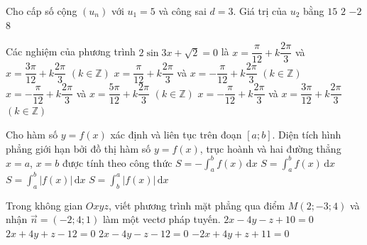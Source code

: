 \begin{ex}%
	Cho cấp số cộng $(u_n)$ với $u_1=5$ và công sai $d=3$. Giá trị của $u_2$ bằng
	\choice
	{$15$}
	{$2$}
	{$-2$}
	{\True $8$}
\end{ex}

\begin{ex}%
	Các nghiệm của phương trình $2\sin3x+\sqrt{2}=0$ là
	\choice
	{$x=\dfrac{\pi}{12}+k\dfrac{2\pi}{3}$ và $x=\dfrac{3\pi}{12}+k\dfrac{2\pi}{3}$ $(k\in\mathbb{Z})$}
	{$x=\dfrac{\pi}{12}+k\dfrac{2\pi}{3}$ và $x=-\dfrac{\pi}{12}+k\dfrac{2\pi}{3}$ $(k\in\mathbb{Z})$ }
	{\True $x=-\dfrac{\pi}{12}+k\dfrac{2\pi}{3}$ và $x=\dfrac{5\pi}{12}+k\dfrac{2\pi}{3}$ $(k\in\mathbb{Z})$}
	{$x=-\dfrac{\pi}{12}+k\dfrac{2\pi}{3}$ và $x=\dfrac{3\pi}{12}+k\dfrac{2\pi}{3}$ $(k\in\mathbb{Z})$}
\end{ex}

\begin{ex}%
	Cho hàm số $y=f(x)$ xác định và liên tục trên đoạn $[a;b]$. Diện tích hình phẳng giới hạn bởi đồ thị hàm số $y=f(x)$, trục hoành và hai đường thẳng $x=a$, $x=b$ được tính theo công thức
	\choice
	{$S=-\displaystyle\int_{a}^{b}f(x)\mathrm{\,d}x$}
	{$S=\displaystyle\int_{a}^{b}f(x)\mathrm{\,d}x$}
	{\True $S=\displaystyle\int_{a}^{b}|f(x)|\mathrm{\,d}x$}
	{$S=\displaystyle\int_{b}^{a}|f(x)|\mathrm{\,d}x$}
\end{ex}

\begin{ex}%
	Trong không gian $Oxyz$, viết phương trình mặt phẳng qua điểm $M\left(2;-3;4\right)$ và nhận $\overrightarrow{n}=(-2;4;1)$ làm một vectơ pháp tuyến.
	\choice
	{$2x-4y-z+10=0$}
	{$2x+4y+z-12=0$}
	{\True $2x-4y-z-12=0$}
	{$-2x+4y+z+11=0$}
\end{ex}

